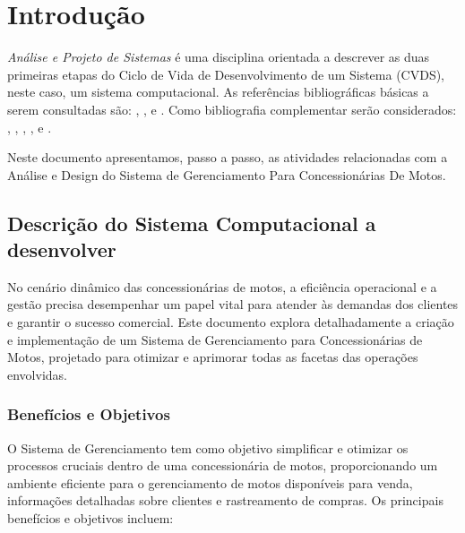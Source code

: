 

\chapter{ Introdu\c{c}\~{a}o}

\textit{An\'{a}lise e Projeto de Sistemas} \'{e} uma disciplina orientada a descrever as duas primeiras etapas do Ciclo de Vida de Desenvolvimento de um Sistema (CVDS), neste caso, um sistema computacional.  As refer\^{e}ncias bibliogr\'{a}ficas b\'{a}sicas a serem consultadas s\~{a}o: \cite{Dennis2014}, \cite{Dennis2019},\cite{Gane1983} e \cite{Sommerville2011}. Como bibliografia complementar ser\~{a}o considerados: \cite{Satzinger2012}, \cite{Shelly2012}, \cite{Valacich2020}, \cite{Kendall2020}, \cite{Budgen2021} e \cite{Engholm2013}.

Neste documento apresentamos, passo a passo,  as atividades relacionadas com a An\'{a}lise e Design do Sistema de Gerenciamento Para Concessionárias De Motos.


 \section{Descri\c{c}\~{a}o do Sistema Computacional a desenvolver}

No cenário dinâmico das concessionárias de motos, a eficiência operacional e a gestão precisa desempenhar um papel vital para atender às demandas dos clientes e garantir o sucesso comercial. Este documento explora detalhadamente a criação e implementação de um Sistema de Gerenciamento para Concessionárias de Motos, projetado para otimizar e aprimorar todas as facetas das operações envolvidas.

        \subsection{Benefícios e Objetivos} 
		O Sistema de Gerenciamento tem como objetivo simplificar e otimizar os processos cruciais dentro de uma concessionária de motos, proporcionando um ambiente eficiente para o gerenciamento de motos disponíveis para venda, informações detalhadas sobre clientes e rastreamento de compras. Os principais benefícios e objetivos incluem:
		
